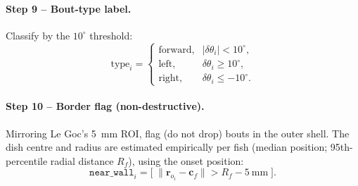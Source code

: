 \documentclass{article}
\begin{document}
\paragraph{Step 9 -- Bout-type label.}
Classify by the $10^\circ$ threshold:
\[
\text{type}_i=
\begin{cases}
\text{forward}, & |\delta\theta_i| < 10^\circ,\\
\text{left},    & \delta\theta_i \ge 10^\circ,\\
\text{right},   & \delta\theta_i \le -10^\circ.
\end{cases}
\]

\paragraph{Step 10 -- Border flag (non-destructive).}
Mirroring Le Goc's 5~mm ROI, flag (do not drop) bouts in the outer shell. The
dish centre and radius are estimated empirically per fish (median position;
95th-percentile radial distance $R_f$), using the onset position:
\[
\texttt{near\_wall}_i = \Big[\;\big\lVert \mathbf{r}_{o_i}-\mathbf{c}_f\big\rVert
> R_f - 5~\text{mm}\;\Big].
\]
\end{document}
